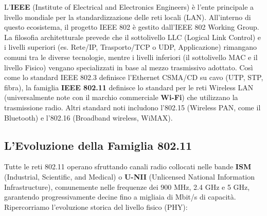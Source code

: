 \documentclass[
  italian,
  openany]{book}
\begin{document}
L'\textbf{IEEE} (Institute of Electrical and Electronics Engineers) è
l'ente principale a livello mondiale per la standardizzazione delle reti
locali (LAN). All'interno di questo ecosistema, il progetto IEEE 802 è
gestito dall'IEEE 802 Working Group. La filosofia architetturale prevede
che il sottolivello LLC (Logical Link Control) e i livelli superiori
(es. Rete/IP, Trasporto/TCP o UDP, Applicazione) rimangano comuni tra le
diverse tecnologie, mentre i livelli inferiori (il sottolivello MAC e il
livello Fisico) vengano specializzati in base al mezzo trasmissivo
adottato. Così come lo standard IEEE 802.3 definisce l'Ethernet CSMA/CD
su cavo (UTP, STP, fibra), la famiglia \textbf{IEEE 802.11} definisce lo
standard per le reti Wireless LAN (universalmente note con il marchio
commerciale \textbf{Wi-Fi}) che utilizzano la trasmissione radio. Altri
standard noti includono l'802.15 (Wireless PAN, come il Bluetooth) e
l'802.16 (Broadband wireless, WiMAX).

\subsection{L'Evoluzione della Famiglia
802.11}\label{levoluzione-della-famiglia-802.11}

Tutte le reti 802.11 operano sfruttando canali radio collocati nelle
bande \textbf{ISM} (Industrial, Scientific, and Medical) o
\textbf{U-NII} (Unlicensed National Information Infrastructure),
comunemente nelle frequenze dei 900 MHz, 2.4 GHz e 5 GHz, garantendo
progressivamente decine fino a migliaia di Mbit/s di capacità.
Ripercorriamo l'evoluzione storica del livello fisico (PHY):
\end{document}
